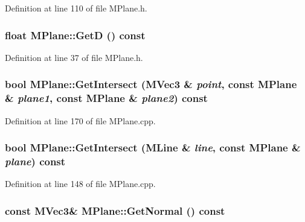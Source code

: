 Definition at line 110 of file MPlane.h.\hypertarget{class_m_plane_5d577b90d83e5c9aab6d221cd9d8bda1}{
\subsubsection[{GetD}]{\setlength{\rightskip}{0pt plus 5cm}float MPlane::GetD () const}}
\label{class_m_plane_5d577b90d83e5c9aab6d221cd9d8bda1}




Definition at line 37 of file MPlane.h.\hypertarget{class_m_plane_e9e32981866df579c81a792bbd5e0d84}{
\subsubsection[{GetIntersect}]{\setlength{\rightskip}{0pt plus 5cm}bool MPlane::GetIntersect ({\bf MVec3} \& {\em point}, \/  const {\bf MPlane} \& {\em plane1}, \/  const {\bf MPlane} \& {\em plane2}) const}}
\label{class_m_plane_e9e32981866df579c81a792bbd5e0d84}




Definition at line 170 of file MPlane.cpp.\hypertarget{class_m_plane_c3d1fdfb5daaff1e8b48b70661c66210}{
\subsubsection[{GetIntersect}]{\setlength{\rightskip}{0pt plus 5cm}bool MPlane::GetIntersect ({\bf MLine} \& {\em line}, \/  const {\bf MPlane} \& {\em plane}) const}}
\label{class_m_plane_c3d1fdfb5daaff1e8b48b70661c66210}




Definition at line 148 of file MPlane.cpp.\hypertarget{class_m_plane_a467926800c24aad63d84af773ee61ba}{
\subsubsection[{GetNormal}]{\setlength{\rightskip}{0pt plus 5cm}const {\bf MVec3}\& MPlane::GetNormal () const}}
\label{class_m_plane_a467926800c24aad63d84af773ee61ba}




